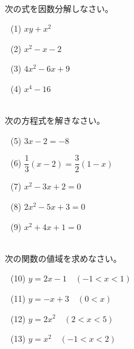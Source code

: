 \documentclass[a4paper]{ltjsarticle}
\begin{document}
%


\fontsize{14truept}{14truept}\selectfont
{}\noindent
{}　
\\[5mm]
　次の式を因数分解しなさい。\\[-5mm]
\begin{enumerate}
    \item[(1)　]$xy+x^2$
    \item[(2)　]$x^2-x-2$
    \item[(3)　]$4x^2-6x+9$
    \item[(4)　]$x^4-16$ \latex
\end{enumerate}\leavevmode\\[-5mm]
　次の方程式を解きなさい。\\[-5mm]
\begin{enumerate}
    \item[(5)　]$3x-2=-8$
    \item[(6)　]$\dfrac{1}{3}(x-2)=\dfrac{3}{2}(1-x)$
    \item[(7)　]$x^2-3x+2=0$
    \item[(8)　]$2x^2-5x+3=0$
    \item[(9)　]$x^2+4x+1=0$ 
\end{enumerate}\leavevmode\\[-5mm]
　次の関数の値域を求めなさい。\\[-5mm]
\begin{enumerate}
    \item[(10)　]$y=2x-1$　$(-1<x<1)$
    \item[(11)　]$y=-x+3$　$(0<x)$
    \item[(12)　]$y=2x^2$　$(2<x<5)$
    \item[(13)　]$y=x^2$　$(-1<x<2)$
\end{enumerate}
\end{document}
